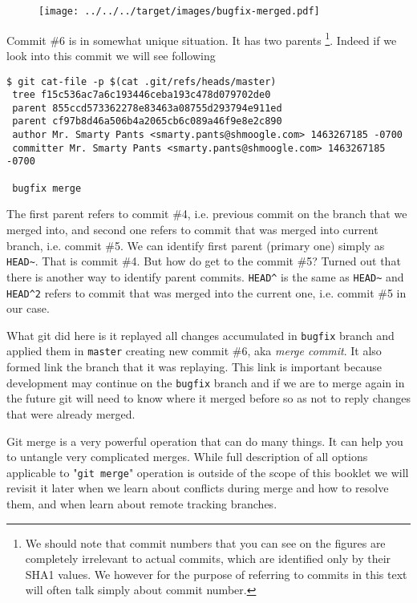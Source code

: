 \documentclass{article}
\theoremstyle{definition}
\begin{document}
        \begin{figure}[h]
        \centering\texttt{[image: ../../../target/images/bugfix-merged.pdf]}
        \caption{\label{fig:bugfix-merged}}
        \end{figure}
        \noindent Commit \#6 is in somewhat unique situation. It has two parents \footnote{We should note that commit
        numbers that you can see on the figures are completely irrelevant to actual commits, which are identified only
        by their SHA1 values. We however for the purpose of referring to commits in this text will often talk simply
        about commit number.}. Indeed if we look into this commit we will see following
        \begin{Verbatim}[frame=single]
 $ git cat-file -p $(cat .git/refs/heads/master)
 tree f15c536ac7a6c193446ceba193c478d079702de0
 parent 855ccd573362278e83463a08755d293794e911ed
 parent cf97b8d46a506b4a2065cb6c089a46f9e8e2c890
 author Mr. Smarty Pants <smarty.pants@shmoogle.com> 1463267185 -0700
 committer Mr. Smarty Pants <smarty.pants@shmoogle.com> 1463267185 -0700

 bugfix merge
        \end{Verbatim}
        The first parent refers to commit \#4, i.e. previous commit on the branch that we merged into, and second one
        refers to commit that was merged into current branch, i.e. commit \#5. We can identify first
        parent (primary one) simply as \texttt{HEAD\textasciitilde}. That is commit \#4. But how do get to the
        commit \#5? Turned out that there is another way to identify parent commits. \texttt{HEAD\^} is the same
        as \texttt{HEAD\textasciitilde} and \texttt{HEAD\^}\texttt{2} refers to commit that was merged into the current
        one, i.e. commit \#5 in our case.

        What git did here is it replayed all changes accumulated in \texttt{bugfix} branch and applied them
        in \texttt{master} creating new commit \#6, aka {\em merge commit}. It also formed link the branch that it was
        replaying. This link is important because development may continue on the \texttt{bugfix} branch and if we are
        to merge again in the future git will need to know where it merged before so as not to reply changes that were
        already merged.

        Git merge is a very powerful operation that can do many things. It can help you to untangle very complicated
        merges. While full description of all options applicable to "\texttt{git merge}" operation is outside of the
        scope of this booklet we will revisit it later when we learn about conflicts during merge and how to resolve
        them, and when learn about remote tracking branches.
\end{document}
